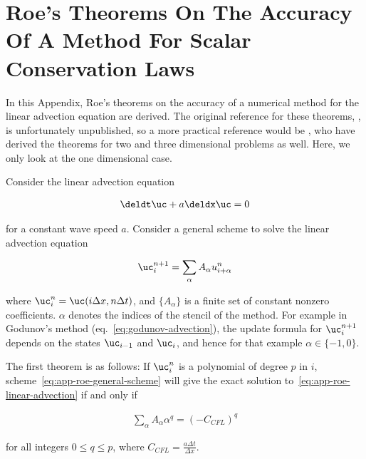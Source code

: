 \chapter{Roe's Theorems On The Accuracy Of A Method For Scalar Conservation Laws}
\label{app:roe}

In this Appendix, Roe's theorems on the accuracy of a numerical method for the linear advection
equation are derived. The original reference for these theorems,
\cite{roep.l.NumericalAlgorithmsLinear1981}, is unfortunately unpublished, so a more practical
reference would be \cite{billetAccuracyStabilityExplicit1997}, who have derived the theorems for
two and three dimensional problems as well. Here, we only look at the one dimensional case.

Consider the linear advection equation

\begin{align}
 \deldt \uc + a \deldx \uc = 0 \label{eq:app-roe-linear-advection}
\end{align}

for a constant wave speed $a$. Consider a general scheme to solve the linear advection equation

\begin{align}
 \uc_i^{n+1} = \sum_\alpha A_\alpha u_{i+\alpha} ^ n \label{eq:app-roe-general-scheme}
\end{align}

where $\uc_i^n = \uc (i \Delta x, n \Delta t)$, and $\{A_\alpha \}$ is a finite set of constant
nonzero coefficients. $\alpha$ denotes the indices of the stencil of the method. For example in
Godunov's method (eq.~\ref{eq:godunov-advection}), the update formula for $\uc_i^{n+1}$ depends on
the states $\uc_{i-1}$ and $\uc_{i}$, and hence for that example $\alpha \in \{-1, 0 \}$.


The first theorem is as follows: If $\uc_i^n$ is a polynomial of degree $p$ in $i$,
scheme~\ref{eq:app-roe-general-scheme} will give the exact solution
to~\ref{eq:app-roe-linear-advection} if and only if

\begin{align}
 \sum_\alpha A_\alpha \alpha^q = (- C_{CFL})^q \label{eq:app-roe-theorem1}
\end{align}

for all integers $0 \leq q \leq p$, where $C_{CFL} = \frac{a \Delta t}{\Delta x}$.

